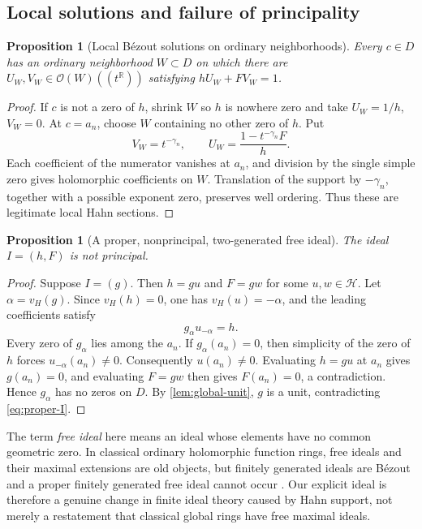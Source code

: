 \documentclass[11pt,letterpaper]{article}
\numberwithin{equation}{section}
\newtheorem{proposition}[theorem]{Proposition}
\theoremstyle{definition}
\theoremstyle{remark}
\newcommand{\R}{\mathbb R}
\newcommand{\OO}{\mathcal O}
\newcommand{\HH}{\mathcal H}
\newcommand{\vH}{v_{\!H}}
\begin{document}
\subsection{Local solutions and failure of principality}
\begin{proposition}[Local B\'ezout solutions on ordinary neighborhoods]
\label{prop:local-bezout}
Every $c\in D$ has an ordinary neighborhood $W\subset D$ on which there
are $U_W,V_W\in\OO(W)((t^\R))$ satisfying $hU_W+FV_W=1$.
\end{proposition}
\begin{proof}
If $c$ is not a zero of $h$, shrink $W$ so $h$ is nowhere zero and take
$U_W=1/h$, $V_W=0$. At $c=a_n$, choose $W$ containing no other zero of
$h$. Put
\[
 V_W=t^{-\gamma_n},\qquad
 U_W=\frac{1-t^{-\gamma_n}F}{h}.
\]
Each coefficient of the numerator vanishes at $a_n$, and division by the
single simple zero gives holomorphic coefficients on $W$. Translation
of the support by $-\gamma_n$, together with a possible exponent zero,
preserves well ordering. Thus these are legitimate local Hahn sections.
\end{proof}

\begin{proposition}[A proper, nonprincipal, two-generated free ideal]
\label{prop:nonprincipal}
The ideal $I=(h,F)$ is not principal.
\end{proposition}
\begin{proof}
Suppose $I=(g)$. Then $h=gu$ and $F=gw$ for some $u,w\in\HH$. Let
$\alpha=\vH(g)$. Since $\vH(h)=0$, one has $\vH(u)=-\alpha$, and the
leading coefficients satisfy
\[
 g_\alpha u_{-\alpha}=h.
\]
Every zero of $g_\alpha$ lies among the $a_n$. If $g_\alpha(a_n)=0$,
then simplicity of the zero of $h$ forces $u_{-\alpha}(a_n)\ne0$.
Consequently $u(a_n)\ne0$. Evaluating $h=gu$ at $a_n$ gives $g(a_n)=0$,
and evaluating $F=gw$ then gives $F(a_n)=0$, a contradiction. Hence
$g_\alpha$ has no zeros on $D$. By \cref{lem:global-unit}, $g$ is a unit,
contradicting \eqref{eq:proper-I}.
\end{proof}

The term \emph{free ideal} here means an ideal whose elements have no
common geometric zero. In classical ordinary holomorphic function rings,
free ideals and their maximal extensions are old objects, but finitely
generated ideals are B\'ezout and a proper finitely generated free ideal
cannot occur \cite{Henriksen52,Henriksen53}. Our explicit ideal is
therefore a genuine change in finite ideal theory caused by Hahn support,
not merely a restatement that classical global rings have free maximal
ideals.
\end{document}
